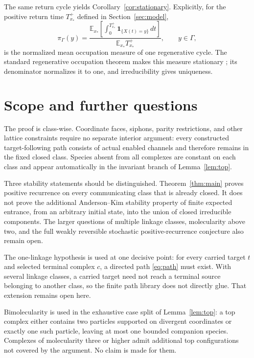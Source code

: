 The same return cycle yields Corollary~\ref{cor:stationary}.  Explicitly, for
the positive return time \(T_{x_*}^+\) defined in Section~\ref{sec:model},
\begin{equation}\label{eq:occupation-formula}
 \pi_\Gamma(y)=
 \frac{\displaystyle
   \mathbb E_{x_*}\!\left[\int_0^{T_{x_*}^+}
      \mathbf1_{\{X(t)=y\}}\,dt\right]}
 {\mathbb E_{x_*}T_{x_*}^+},
 \qquad y\in\Gamma,
\end{equation}
is the normalized mean occupation measure of one regenerative cycle.  The
standard regenerative occupation theorem makes this measure stationary
\citep{Asmussen2003}; its denominator normalizes it to one, and irreducibility
gives uniqueness.

\section{Scope and further questions}\label{sec:scope}

The proof is class-wise.  Coordinate faces, siphons, parity restrictions, and
other lattice constraints require no separate interior argument: every
constructed target-following path consists of actual enabled channels and
therefore remains in the fixed closed class.  Species absent from all
complexes are constant on each class and appear automatically in the
invariant branch of Lemma~\ref{lem:top}.

Three stability statements should be distinguished.  Theorem~\ref{thm:main}
proves positive recurrence on every communicating class that is already
closed.  It does not prove the additional Anderson--Kim stability property of
finite expected entrance, from an arbitrary initial state, into the union of
closed irreducible components.  The larger questions of multiple linkage
classes, molecularity above two, and the full weakly reversible stochastic
positive-recurrence conjecture also remain open.

The one-linkage hypothesis is used at one decisive point: for every carried
target \(t\) and selected terminal complex \(c\), a directed path
\eqref{eq:path} must exist.  With several linkage classes, a carried target
need not reach a terminal source belonging to another class, so the finite
path library does not directly glue.  That extension remains open here.

Bimolecularity is used in the exhaustive case split of
Lemma~\ref{lem:top}: a top complex either contains two particles supported on
divergent coordinates or exactly one such particle, leaving at most one
bounded companion species.  Complexes of molecularity three or higher admit
additional top configurations not covered by the argument.  No claim is made
for them.

